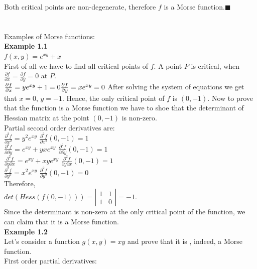 \documentclass[]{article}
\begin{document}
Both critical points are non-degenerate, therefore $f$ is a Morse function.$\blacksquare$\\
\\
\\
Examples of Morse functions: \\
\textbf{Example 1.1}\\
$f(x,y)=e^{xy}+x$\\
First of all we have to find all critical points of $f$. A point $P$ is critical, when $\frac{\partial f}{\partial x}=\frac{\partial f}{\partial y}=0$ at $P$. \\
$\frac{\partial f}{\partial x}= ye^{xy}+1=0 \\
\frac{\partial f}{\partial y}=xe^{xy}=0$
After solving the system of equations we get that $x=0$, $y=-1$. Hence, the only critical point of $f$ is $(0,-1)$. Now to prove that the function is a Morse function we have to shoe that the determinant of Hessian matrix at the point $(0,-1)$ is non-zero. \\
Partial second order derivatives are: \\
$\frac{\partial^2 f}{\partial x^2}=y^2e^{xy}$
$\frac{\partial^2 f}{\partial x^2}(0,-1)=1$\\
$\frac{\partial^2 f}{\partial \partial y}=e^{xy}+yxe^{xy}$
$\frac{\partial^2 f}{\partial \partial y}(0,-1)=1$\\
$\frac{\partial^2 f}{\partial y \partial x}=e^{xy}+xye^{xy}$
$\frac{\partial^2 f}{\partial y \partial x}(0,-1)=1$\\
$\frac{\partial^2 f}{\partial y^2}=x^2e^{xy}$
$\frac{\partial^2 f}{\partial y^2}(0,-1)=0$\\
Therefore, \\
$det(Hess(f(0,-1)))=\left| \begin{array}{cc} 1 & 1 \\ 1 & 0 \end{array} \right|=-1$. \\
Since the determinant is non-zero at the only critical point of the function, we can claim that it is a Morse function. \\
\textbf{Example 1.2}\\
Let's consider a function $g(x,y)=xy$ and prove that it is , indeed, a Morse function.\\
First order partial derivatives: \\
\end{document}
